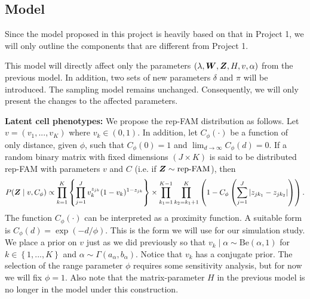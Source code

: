\documentclass[12pt,]{article}
\newcommand{\p}[1]{\left(#1\right)}
\newcommand{\bc}[1]{ \left\{#1\right\} }
\newcommand{\abs}[1]{ \left|#1\right| }
\def\Be{\text{Be}}
\newcommand{\bZ}{\mbox{\boldmath $Z$}}
\newcommand{\bW}{\mbox{\boldmath $W$}}
\begin{document}
\subsection{Model}
Since the model proposed in this project is heavily based on that in Project 1,
we will only outline the components that are different from Project 1.

This model will directly affect only the parameters $(\lambda, \bW, \bZ, H, v,
\alpha)$ from the previous model. In addition, two sets of new parameters
$\delta$ and $\pi$ will be introduced. The sampling model remains unchanged.
Consequently, we will only present the changes to the affected parameters. 

\textbf{Latent cell phenotypes:} We propose the rep-FAM distribution as
follows.  Let $v = (v_1, ..., v_K)$ where $v_k \in (0,1)$. In addition, let
$C_\phi(\cdot)$ be a function of only distance, given $\phi$, such that
$C_\phi(0)=1$ and $\lim_{d\rightarrow\infty}C_\phi(d) = 0$. If a random
binary matrix with fixed dimensions $(J\times K)$ is said to be distributed
rep-FAM with parameters $v$ and $C$ (i.e. if $\bZ \sim \text{rep-FAM}$), then
$$
P(\bZ \mid v, C_\phi) \propto \prod_{k=1}^K  \bc{\prod_{j=1}^J v_k^{z_{jk}}(1-v_k)^{1-z_{jk}}} \times
\prod_{k_1=1}^{K-1}\prod_{k_2=k_1+1}^{K} \p{1 - C_\phi\p{\sum_{j=1}^J \abs{z_{jk_1} - z_{jk_2}}}}.
$$
The function $C_\phi(\cdot)$ can be interpreted as a proximity function. A
suitable form is $C_\phi(d) = \exp\p{-d/\phi}$. This is the form we will use
for our simulation study. We place a prior on $v$ just as we did previously so
that $v_k \mid \alpha \sim \Be(\alpha, 1)$ for $k\in\bc{1,...,K}$ and $\alpha
\sim \Gamma(a_\alpha, b_\alpha)$. Notice that $v_k$ has a conjugate prior.  The
selection of the range parameter $\phi$ requires some sensitivity analysis, but
for now we will fix $\phi=1$. Also note that the matrix-parameter $H$ in the
previous model is no longer in the model under this construction.
\end{document}
